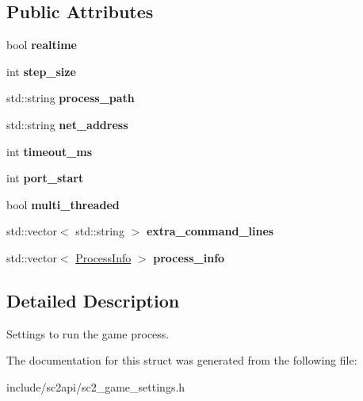 \subsection*{Public Attributes}
\begin{DoxyCompactItemize}
\item 
\mbox{\label{structsc2_1_1_process_settings_a2720fc0137245101de56ea2ef150e8a0}} 
bool {\bfseries realtime}
\item 
\mbox{\label{structsc2_1_1_process_settings_a408a3a92cb61339830c831742adfbb4a}} 
int {\bfseries step\+\_\+size}
\item 
\mbox{\label{structsc2_1_1_process_settings_abbc11a42555fa0a1e036ee7c9bbccb48}} 
std\+::string {\bfseries process\+\_\+path}
\item 
\mbox{\label{structsc2_1_1_process_settings_aaf19b8eb91c8e8d29cc111452971f846}} 
std\+::string {\bfseries net\+\_\+address}
\item 
\mbox{\label{structsc2_1_1_process_settings_ad9a9aa89b406de8ed838bfcdfbeb3212}} 
int {\bfseries timeout\+\_\+ms}
\item 
\mbox{\label{structsc2_1_1_process_settings_af3c345fbed5244b4e87d5400f41a8b95}} 
int {\bfseries port\+\_\+start}
\item 
\mbox{\label{structsc2_1_1_process_settings_acfcb81c1496917bf9d1eceb523e95564}} 
bool {\bfseries multi\+\_\+threaded}
\item 
\mbox{\label{structsc2_1_1_process_settings_afc9af209c9f715c2bea2dcd916fe263e}} 
std\+::vector$<$ std\+::string $>$ {\bfseries extra\+\_\+command\+\_\+lines}
\item 
\mbox{\label{structsc2_1_1_process_settings_a65ac75579205357a6c59c500fb8783f8}} 
std\+::vector$<$ \hyperlink{structsc2_1_1_process_info}{Process\+Info} $>$ {\bfseries process\+\_\+info}
\end{DoxyCompactItemize}


\subsection{Detailed Description}
Settings to run the game process. 

The documentation for this struct was generated from the following file\+:\begin{DoxyCompactItemize}
\item 
include/sc2api/sc2\+\_\+game\+\_\+settings.\+h\end{DoxyCompactItemize}
